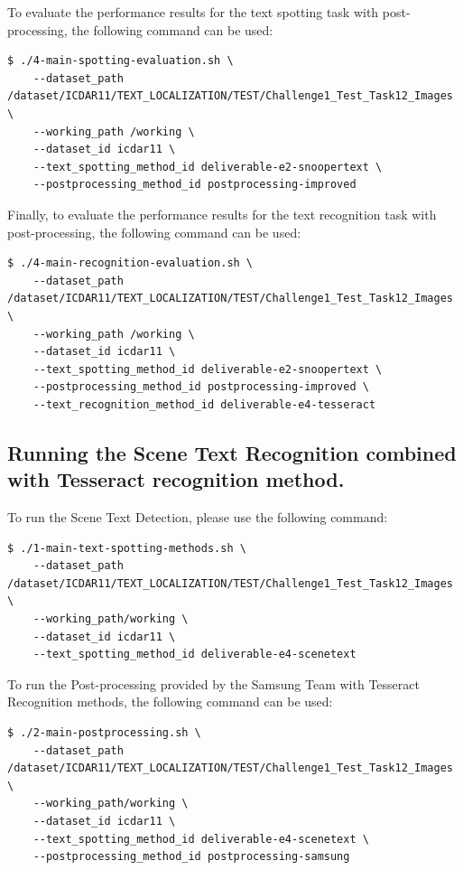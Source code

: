 To evaluate the performance results for the text spotting task with post-processing, the following command can be used:
\begin{lstlisting}[style=fancyterminal]
 $ ./4-main-spotting-evaluation.sh \
    --dataset_path /dataset/ICDAR11/TEXT_LOCALIZATION/TEST/Challenge1_Test_Task12_Images \
    --working_path /working \
    --dataset_id icdar11 \
    --text_spotting_method_id deliverable-e2-snoopertext \
    --postprocessing_method_id postprocessing-improved
\end{lstlisting}

Finally, to evaluate the performance results for the text recognition task with post-processing, the following command can be used:
\begin{lstlisting}[style=fancyterminal]
 $ ./4-main-recognition-evaluation.sh \
    --dataset_path /dataset/ICDAR11/TEXT_LOCALIZATION/TEST/Challenge1_Test_Task12_Images \
    --working_path /working \
    --dataset_id icdar11 \
    --text_spotting_method_id deliverable-e2-snoopertext \
    --postprocessing_method_id postprocessing-improved \
    --text_recognition_method_id deliverable-e4-tesseract
\end{lstlisting}

\subsection{Running the Scene Text Recognition combined with Tesseract recognition method.}

To run the Scene Text Detection, please use the following command:
\begin{lstlisting}[style=fancyterminal]
 $ ./1-main-text-spotting-methods.sh \
    --dataset_path /dataset/ICDAR11/TEXT_LOCALIZATION/TEST/Challenge1_Test_Task12_Images \
    --working_path/working \
    --dataset_id icdar11 \
    --text_spotting_method_id deliverable-e4-scenetext
\end{lstlisting}

To run the Post-processing provided by the Samsung Team with Tesseract Recognition methods, the following command can be used:
\begin{lstlisting}[style=fancyterminal]
 $ ./2-main-postprocessing.sh \
    --dataset_path /dataset/ICDAR11/TEXT_LOCALIZATION/TEST/Challenge1_Test_Task12_Images \
    --working_path/working \
    --dataset_id icdar11 \
    --text_spotting_method_id deliverable-e4-scenetext \
    --postprocessing_method_id postprocessing-samsung
\end{lstlisting}

